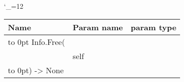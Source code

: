 \begingroup \catcode`\_=12 \tt
\begin{tabular}{lll}
\toprule
\textrm{Name}&\textrm{Param name}&\textrm{param type}\\
\midrule
\hbox to 0pt {Info.Free(\hss}\\
& self\\
\hbox to 0pt{) -> None\hss}\\
\bottomrule
\end{tabular}
\endgroup
